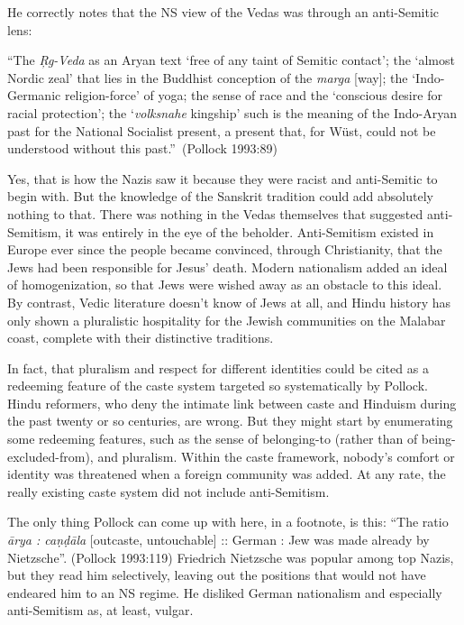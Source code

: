 He correctly notes that the NS view of the Vedas was through an anti-Semitic lens: 
\begin{myquote}
“The {\sl Ŗg-Veda} as an Aryan text ‘free of any taint of Semitic contact’; the ‘almost Nordic zeal’ that lies in the Buddhist conception of the {\sl marga} [way]; the ‘Indo-Germanic religion-force’ of yoga; the sense of race and the ‘conscious desire for racial protection’; the ‘{\sl volksnahe} kingship’ such is the meaning of the Indo-Aryan past for the National Socialist present, a present that, for Wüst, could not be understood without this past.”~\hfill(Pollock 1993:89)
\end{myquote}

Yes, that is how the Nazis saw it because they were racist and anti-Semitic to begin with. But the knowledge of the Sanskrit tradition could add absolutely nothing to that. There was nothing in the Vedas themselves that suggested anti-Semitism, it was entirely in the eye of the beholder. Anti-Semitism existed in Europe ever since the people became convinced, through Christianity, that the Jews had been responsible for Jesus’ death. Modern nationalism added an ideal of homogenization, so that Jews were wished away as an obstacle to this ideal. By contrast, Vedic literature doesn’t know of Jews at all, and Hindu history has only shown a pluralistic hospitality for the Jewish communities on the Malabar coast, complete with their distinctive traditions.

In fact, that pluralism and respect for different identities could be cited as a redeeming feature of the caste system targeted so systematically by Pollock. Hindu reformers, who deny the intimate link between caste and Hinduism during the past twenty or so centuries, are wrong. But they might start by enumerating some redeeming features, such as the sense of belonging-to (rather than of being-excluded-from), and pluralism. Within the caste framework, nobody’s comfort or identity was threatened when a foreign community was added. At any rate, the really existing caste system did not include anti-Semitism.

The only thing Pollock can come up with here, in a footnote, is this: “The ratio {\sl ārya : caṇḍāla} [outcaste, untouchable] :: German : Jew was made already by Nietzsche”. (Pollock 1993:119) Friedrich Nietzsche was popular among top Nazis, but they read him selectively, leaving out the positions that would not have endeared him to an NS regime. He disliked German nationalism and especially anti-Semitism as, at least, vulgar.

